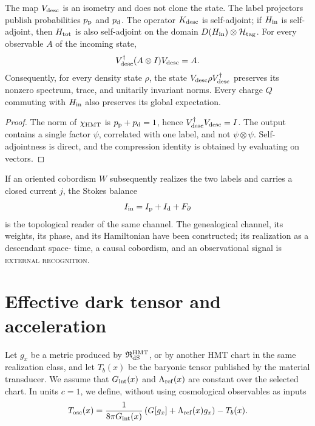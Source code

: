 \begin{theorem}
\label{thm:hmtf2-canal-descendiente}
The map \(V_{\rm desc}\) is an isometry and does not clone the state. The
label projectors publish probabilities \(p_{\rm p}\) and
\(p_{\rm d}\). The operator \(K_{\rm desc}\) is self-adjoint; if
\(H_{\rm in}\) is self-adjoint, then \(H_{\rm tot}\) is also self-adjoint on the domain
\(D(H_{\rm in})\otimes\mathcal H_{\rm tag}\). For every observable
\(A\) of the incoming state,
\[
 V_{\rm desc}^{\dagger}(A\otimes I)V_{\rm desc}=A.
\]
Consequently, for every density state \(\rho\), the state
\(V_{\rm desc}\rho V_{\rm desc}^{\dagger}\) preserves its nonzero spectrum,
trace, and unitarily invariant norms. Every charge \(Q\) commuting with
\(H_{\rm in}\) also preserves its global expectation.
\end{theorem}

\begin{proof}
The norm of \(\chi_{\rm HMT}\) is
\(p_{\rm p}+p_{\rm d}=1\), hence \(V_{\rm desc}^{\dagger}V_{\rm desc}=I\).
The output contains a single factor \(\psi\), correlated with one label,
and not \(\psi\otimes\psi\). Self-adjointness is direct, and the
compression identity is obtained by evaluating on vectors.
\end{proof}

If an oriented cobordism \(W\) subsequently realizes the two labels and carries
a closed current \(j\), the Stokes balance
\[
 I_{\rm in}=I_{\rm p}+I_{\rm d}+F_\partial
\]
is the topological reader of the same channel. The genealogical channel, its weights, its
phase, and its Hamiltonian have been constructed; its realization as a descendant space-
time, a causal cobordism, and an observational signal is
\textsc{external recognition}.

\section{Effective dark tensor and acceleration}
\label{sec:hmtf2-sector-oscuro}

Let \(g_x\) be a metric produced by \(\mathfrak R_{\rm dS}^{\rm HMT}\), or by another HMT chart in the same realization class, and let \(T_b(x)\) be the baryonic tensor published by the material transducer. We assume that \(G_{\rm int}(x)\) and \(\Lambda_{\rm ref}(x)\) are constant over the selected chart. In units \(c=1\), we define, without using cosmological observables as inputs
\[
 T_{\rm osc}(x)
 =\frac1{8\pi G_{\rm int}(x)}
 \left(G[g_x]+\Lambda_{\rm ref}(x)g_x\right)-T_b(x).
\]

